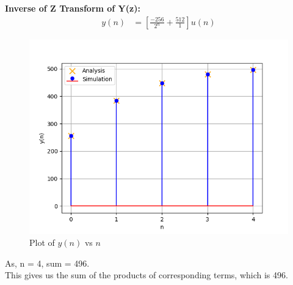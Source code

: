 \documentclass[journal,12pt,twocolumn]{IEEEtran}
\theoremstyle{remark}
\begin{document}
\textbf{Inverse of Z Transform of Y(z):} \\
\begin{align}
y(n) &= \left[\frac{-256}{2^{n}} + \frac{512}{1}\right]u(n)
\end{align}
\begin{figure}[h!]
    \centering
    \includegraphics[width=\columnwidth]{figs/fig1.png}
    \caption{Plot of $y(n)$ vs $n$}
    \label{fig:1}
\end{figure}
As, n = 4, sum = 496. \\
This gives us the sum of the products of corresponding terms, which is 496.
\end{document}
